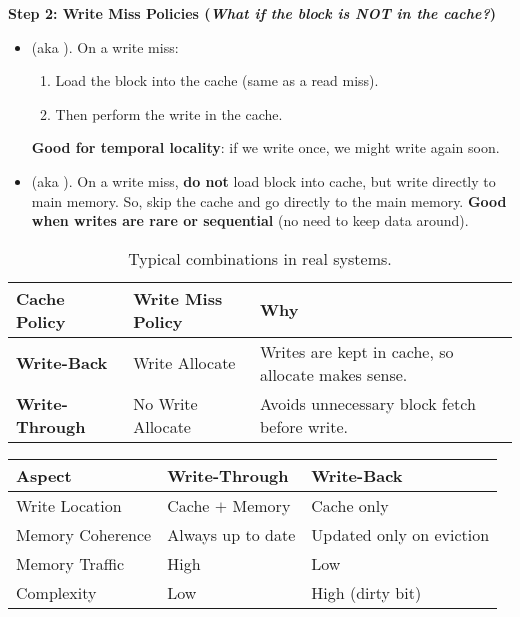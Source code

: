 \newpage

\begin{flushleft}
    \textcolor{Green3}{ \textbf{Step 2: Write Miss Policies (\emph{What if the block is NOT in the cache?})}}
\end{flushleft}
\begin{itemize}
    \item {} (aka ). On a write miss:
    \begin{enumerate}
        \item Load the block into the cache (same as a read miss).
        \item Then perform the write in the cache.
    \end{enumerate}
    \textbf{Good for temporal locality}: if we write once, we might write again soon.

    \item {} (aka ). On a write miss, \textbf{do not} load block into cache, but write directly to main memory. So, skip the cache and go directly to the main memory. \textbf{Good when writes are rare or sequential} (no need to keep data around).
\end{itemize}

\begin{table}[!htp]
    \centering
    \begin{tabular}{@{} l l p{16em} @{}}
        \toprule
        Cache Policy & Write Miss Policy & Why \\
        \midrule
        \textbf{Write-Back}     & Write Allocate    & Writes are kept in cache, so allocate makes sense. \\ [.3em]
        \textbf{Write-Through}  & No Write Allocate & Avoids unnecessary block fetch before write. \\
        \bottomrule
    \end{tabular}
    \caption{Typical combinations in real systems.}
\end{table}

\begin{table}[!htp]
    \centering
    \begin{tabular}{@{} l l l @{}}
        \toprule
        Aspect & Write-Through & Write-Back \\
        \midrule
        Write Location   & Cache $+$ Memory  & Cache only               \\ [.3em]
        Memory Coherence & Always up to date & Updated only on eviction \\ [.3em]
        Memory Traffic   & High              & Low                      \\ [.3em]
        Complexity       & Low               & High (dirty bit)         \\
        \bottomrule
    \end{tabular}
\end{table}

